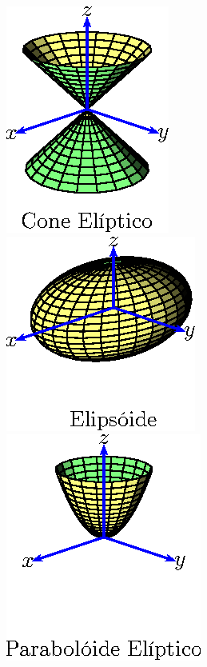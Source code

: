 \begin{figure}[htp]
\includegraphics{cap_superficies/figs/figura_2}
\includegraphics{cap_superficies/figs/figura_3}
\includegraphics{cap_superficies/figs/figura_4}


\end{figure}
